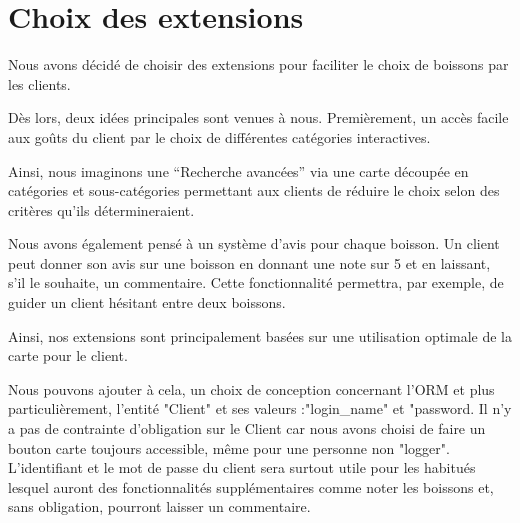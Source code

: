 

\section{Choix des extensions}
Nous avons décidé de choisir des extensions pour faciliter
le choix de boissons par les clients.

Dès lors, deux idées principales sont venues à nous. 
Premièrement, un accès facile aux goûts du client par 
le choix de différentes catégories interactives.

Ainsi, nous imaginons une ``Recherche avancées'' via une carte 
découpée en catégories et sous-catégories permettant aux clients de
réduire le choix selon des critères qu'ils détermineraient. 

Nous avons également pensé à un système d'avis pour chaque boisson. 
Un client peut donner son avis sur une boisson en donnant une note
sur 5 et en laissant, s'il le souhaite, un commentaire. Cette
fonctionnalité permettra, par exemple, de guider un client hésitant
entre deux boissons.

Ainsi, nos extensions sont principalement basées sur une utilisation
optimale de la carte pour le client.

Nous pouvons ajouter à cela, un choix de conception concernant l'ORM et plus particulièrement, 
l'entité "Client" et ses valeurs :"login_name" et "password. Il n'y a pas de contrainte d'obligation sur le Client 
car nous avons choisi de faire un bouton carte toujours accessible, même pour une personne non "logger".
L'identifiant et le mot de passe du client sera surtout utile pour les habitués lesquel auront des fonctionnalités supplémentaires
comme noter les boissons et, sans obligation, pourront laisser un commentaire.


